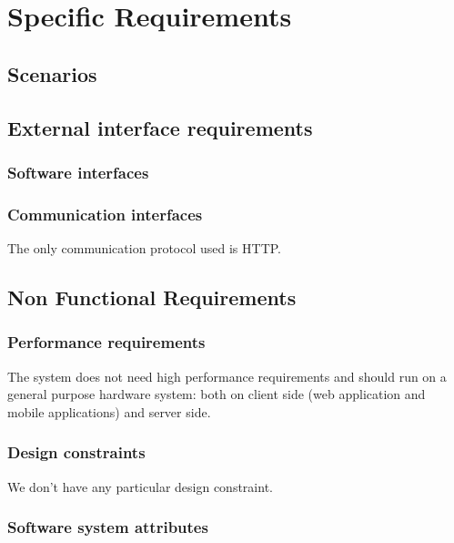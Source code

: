 \chapter{Specific Requirements}

\section{Scenarios}



\section{External interface requirements}

\subsection{Software interfaces}

\subsection{Communication interfaces}
The only communication protocol used is HTTP.


\section{Non Functional Requirements}
\subsection{Performance requirements}
The system does not need high performance requirements and should run on a general purpose hardware system: both on client side (web application and mobile applications) and server side.
\subsection{Design constraints}
We don't have any particular design constraint.
\subsection{Software system attributes}